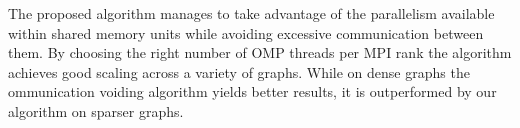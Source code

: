 The proposed algorithm manages to take advantage of the parallelism available within shared memory units while avoiding excessive communication between them. By choosing the right number of OMP threads per MPI rank the algorithm achieves good scaling across a variety of graphs. While on dense graphs the ommunication voiding algorithm \cite{comm_avoiding} yields better results, it is outperformed by our algorithm on sparser graphs. 